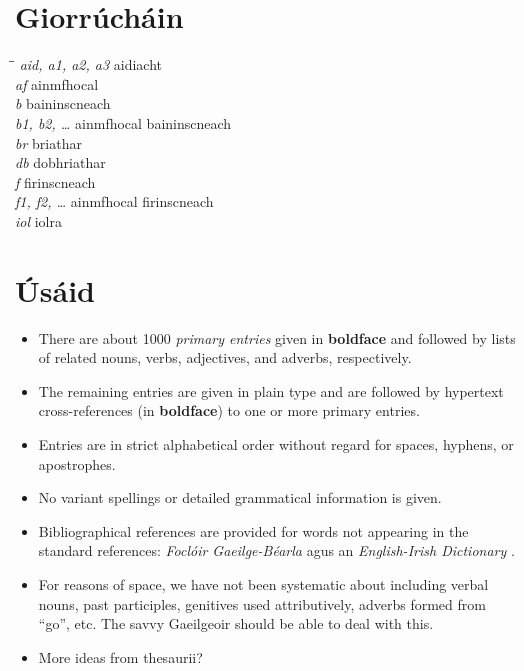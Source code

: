 \chapter*{Giorr\'uch\'ain} 
\begin{tabbing}
\hspace*{35ex}\=\hspace{25ex}\=\kill
\> {\it aid, a1, a2, a3} \> aidiacht \\
\> {\it af} \> ainmfhocal \\
\> {\it b} \> baininscneach \\
\> {\it b1, b2, \ldots} \> ainmfhocal baininscneach \\
\> {\it br} \> briathar \\
\> {\it db} \> dobhriathar \\
\> {\it f} \> firinscneach \\
\> {\it f1, f2, \ldots} \> ainmfhocal firinscneach \\
\> {\it iol} \> iolra \\
\end{tabbing}

\chapter*{{\'U}s\'aid} 

\begin{itemize}
\item There are about 1000 {\em primary entries} given in {\bf boldface}
and followed by lists of related nouns, verbs, adjectives, and
adverbs, respectively.  
\vspace{2ex}
\item The remaining entries are given in plain type and are followed by 
hypertext cross-references (in {\bf boldface}) to one or more primary entries.
\vspace{2ex}
\item Entries are in strict alphabetical order without regard for
spaces, hyphens, or apostrophes.
\vspace{2ex}
\item No variant spellings or detailed grammatical information is given.
\vspace{2ex}
\item Bibliographical references are provided for words not
appearing in the standard references: 
{\it Focl\'oir Gaeilge-B\'earla} \cite{OD77} agus
an {\it English-Irish Dictionary} \cite{Ba59}.
\vspace{2ex}
\item For reasons of space, we have not been systematic about including 
verbal nouns, 
past participles, genitives used attributively, adverbs formed from
``go'', etc.  The savvy Gaeilgeoir should be able to deal with this.
\vspace{2ex}
\item More ideas from thesaurii?
\end{itemize}
\endinput
